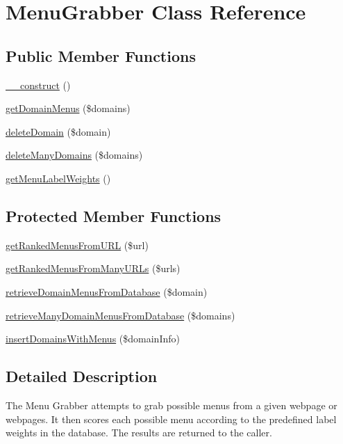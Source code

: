 \hypertarget{classMenuGrabber}{\section{Menu\-Grabber Class Reference}
\label{classMenuGrabber}
}
\subsection*{Public Member Functions}
\begin{DoxyCompactItemize}
\item 
\hyperlink{classMenuGrabber_ac95c640a95578eae70e354372f706528}{\-\_\-\-\_\-construct} ()
\item 
\hyperlink{classMenuGrabber_a82affc87b1f73fcf57f0dd6a0be20bdb}{get\-Domain\-Menus} (\$domains)
\item 
\hyperlink{classMenuGrabber_aacc8b06427fda409f2385d5ff189509a}{delete\-Domain} (\$domain)
\item 
\hyperlink{classMenuGrabber_a90913d8567536c5e277d6dad66b306bf}{delete\-Many\-Domains} (\$domains)
\item 
\hyperlink{classMenuGrabber_a55274935e94d4e811f592a28ee62da9a}{get\-Menu\-Label\-Weights} ()
\end{DoxyCompactItemize}
\subsection*{Protected Member Functions}
\begin{DoxyCompactItemize}
\item 
\hyperlink{classMenuGrabber_a837c936f2e2df191018092e2745dd5f9}{get\-Ranked\-Menus\-From\-U\-R\-L} (\$url)
\item 
\hyperlink{classMenuGrabber_a44023dd73d16f03c6a15bf1d6228491f}{get\-Ranked\-Menus\-From\-Many\-U\-R\-Ls} (\$urls)
\item 
\hyperlink{classMenuGrabber_acbbe3d83251aa6f0f5c1d5a073818f4a}{retrieve\-Domain\-Menus\-From\-Database} (\$domain)
\item 
\hyperlink{classMenuGrabber_a0fa3d0bdd671df3fe2b3c18907a7a1a1}{retrieve\-Many\-Domain\-Menus\-From\-Database} (\$domains)
\item 
\hyperlink{classMenuGrabber_a0b613eb7bef68287d68b2eff4867071e}{insert\-Domains\-With\-Menus} (\$domain\-Info)
\end{DoxyCompactItemize}


\subsection{Detailed Description}
The Menu Grabber attempts to grab possible menus from a given webpage or webpages. It then scores each possible menu according to the predefined label weights in the database. The results are returned to the caller.

